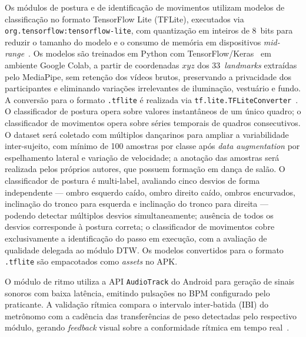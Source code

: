 Os módulos de postura e de identificação de movimentos utilizam modelos de classificação
no formato TensorFlow Lite (TFLite), executados via \texttt{org.tensorflow:tensorflow-lite},
com quantização em inteiros de 8~bits para reduzir o tamanho do modelo e o consumo de
memória em dispositivos \textit{mid-range}~\cite{bursa2023tflite}. Os modelos são treinados em Python com TensorFlow/Keras~\cite{abadi2016tensorflow}
em ambiente Google Colab, a partir de coordenadas $xyz$ dos 33~\textit{landmarks}
extraídas pelo MediaPipe, sem retenção dos vídeos brutos, preservando a privacidade
dos participantes e eliminando variações irrelevantes de iluminação, vestuário e fundo.
A conversão para o formato \texttt{.tflite} é realizada via
\texttt{tf.lite.TFLiteConverter}~\cite{lee2019ondevice}.
O classificador de postura opera sobre valores instantâneos de um único quadro;
o classificador de movimentos opera sobre séries temporais de quadros consecutivos. O dataset será coletado com múltiplos dançarinos para
ampliar a variabilidade inter-sujeito, com mínimo de 100 amostras por classe após
\textit{data augmentation} por espelhamento lateral e variação de velocidade; a anotação
das amostras será realizada pelos próprios autores, que possuem formação em dança de
salão. O classificador de postura é multi-label, avaliando cinco desvios de forma
independente --- ombro esquerdo caído, ombro direito caído, ombros encurvados,
inclinação do tronco para esquerda e inclinação do tronco para direita ---
podendo detectar múltiplos desvios simultaneamente; ausência de todos os
desvios corresponde à postura correta; o classificador de movimentos cobre
exclusivamente a identificação do passo em execução, com a avaliação de
qualidade delegada ao módulo DTW. Os modelos convertidos
para o formato \texttt{.tflite} são empacotados como \textit{assets} no APK.

O módulo de ritmo utiliza a API \texttt{AudioTrack} do Android para geração de sinais
sonoros com baixa latência, emitindo pulsações no BPM configurado pelo praticante. A
validação rítmica compara o intervalo inter-batida (IBI) do metrônomo com a cadência das
transferências de peso detectadas pelo respectivo módulo, gerando \textit{feedback} visual
sobre a conformidade rítmica em tempo real~\cite{rose2019metronome}.

